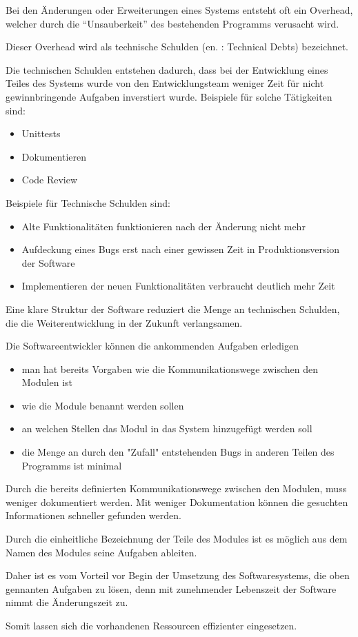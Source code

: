 Bei den Änderungen oder Erweiterungen eines Systems entsteht oft ein Overhead, welcher durch die ``Unsauberkeit'' des bestehenden Programms verusacht wird.

Dieser Overhead wird als technische Schulden (en. : Technical Debts) bezeichnet.

Die technischen Schulden entstehen dadurch, dass bei der Entwicklung eines Teiles des Systems wurde 
von den Entwicklungsteam weniger Zeit für nicht gewinnbringende Aufgaben inverstiert wurde.
Beispiele für solche Tätigkeiten sind:
\begin{itemize}
    \item Unittests
    \item Dokumentieren 
    \item Code Review
\end{itemize}

Beispiele für Technische Schulden sind:
\begin{itemize}
    \item Alte Funktionalitäten funktionieren nach der Änderung nicht mehr
    \item Aufdeckung eines Bugs erst nach einer gewissen Zeit in Produktionsversion der Software
    \item Implementieren der neuen Funktionalitäten verbraucht deutlich mehr Zeit
\end{itemize}

Eine klare Struktur der Software reduziert die Menge an technischen Schulden, 
die die Weiterentwicklung in der Zukunft verlangsamen. 

Die Softwareentwickler können die ankommenden Aufgaben erledigen
\begin{itemize}
    \item man hat bereits Vorgaben wie die Kommunikationswege zwischen den Modulen ist
    \item wie die Module benannt werden sollen
    \item an welchen Stellen das Modul in das System hinzugefügt werden soll
    \item die Menge an durch den "Zufall" entstehenden Bugs in anderen Teilen des Programms ist minimal
\end{itemize}

Durch die bereits definierten Kommunikationswege zwischen den Modulen, muss weniger dokumentiert werden.
Mit weniger Dokumentation können die gesuchten Informationen schneller gefunden werden.

Durch die einheitliche Bezeichnung der Teile des Modules ist es möglich aus dem Namen des Modules seine Aufgaben ableiten.

Daher ist es vom Vorteil vor Begin der Umsetzung des Softwaresystems, die oben gennanten Aufgaben zu lösen,
denn mit zunehmender Lebenszeit der Software nimmt die Änderungszeit zu.

Somit lassen sich die vorhandenen Ressourcen effizienter eingesetzen.